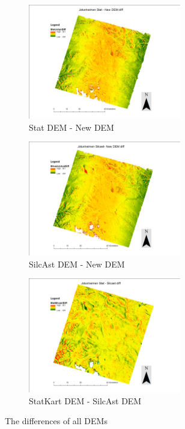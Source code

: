 \documentclass[a4paper,UKenglish]{article}
\begin{document}
\begin{figure}
	\begin{subfigure}{.5\textwidth}
		  \centering
		  \includegraphics[height=5cm]{StatJotunDiff}
		  \caption{Stat DEM - New DEM}
		  \label{SJD}
	\end{subfigure}%
	\begin{subfigure}{.5\textwidth}
		  \centering
		  \includegraphics[height=5cm]{SilcastJotunDiff}
		  \caption{SilcAst DEM - New DEM}
		  \label{SiJD}
	\end{subfigure}
	\begin{subfigure}{.5\textwidth}
	 	\centering
	 	\includegraphics[height=5cm]{StatSilcastDiff}
	 	\caption{StatKart DEM - SilcAst DEM}
	 	\label{SSiD}
	\end{subfigure}
	\caption{The differences of all DEMs}
	\label{diffs}
\end{figure}
\end{document}
